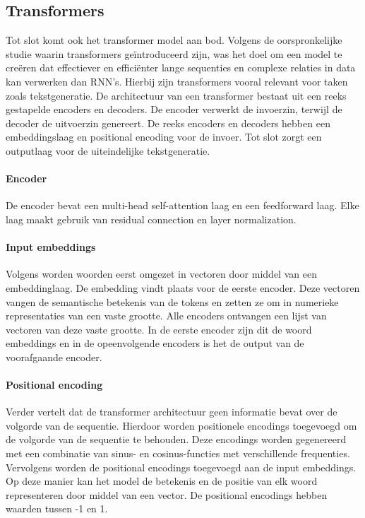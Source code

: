 \subsection{Transformers}
Tot slot komt ook het transformer model aan bod. Volgens de oorspronkelijke studie \autocite{Vaswani2017} waarin transformers geïntroduceerd zijn, was het doel om een model te creëren dat effectiever en efficiënter lange sequenties en complexe relaties in data kan verwerken dan RNN’s. Hierbij zijn transformers vooral relevant voor taken zoals tekstgeneratie. De architectuur van een transformer bestaat uit een reeks gestapelde encoders en decoders. De encoder verwerkt de invoerzin, terwijl de decoder de uitvoerzin genereert. De reeks encoders en decoders hebben een embeddingslaag en positional encoding voor de invoer. Tot slot zorgt een outputlaag voor de uiteindelijke tekstgeneratie.

\paragraph{Encoder}
De encoder bevat een multi-head self-attention laag en een feedforward laag. Elke laag maakt gebruik van residual connection en layer normalization.

\paragraph{Input embeddings}
Volgens \textcite{Islam2023} worden woorden eerst omgezet in vectoren door middel van een embeddinglaag. De embedding vindt plaats voor de eerste encoder. Deze vectoren vangen de semantische betekenis van de tokens en zetten ze om in numerieke representaties van een vaste grootte. Alle encoders ontvangen een lijst van vectoren van deze vaste grootte. In de eerste encoder zijn dit de woord embeddings en in de opeenvolgende encoders is het de output van de voorafgaande encoder.

\paragraph{Positional encoding}
Verder vertelt \textcite{Sajun2024} dat de transformer architectuur geen informatie bevat over de volgorde van de sequentie. Hierdoor worden positionele encodings toegevoegd om de volgorde van de sequentie te behouden. Deze encodings worden gegenereerd met een combinatie van sinus- en cosinus-functies met verschillende frequenties. Vervolgens worden de positional encodings toegevoegd aan de input embeddings. Op deze manier kan het model de betekenis en de positie van elk woord representeren door middel van een vector. De positional encodings hebben waarden tussen -1 en 1.


